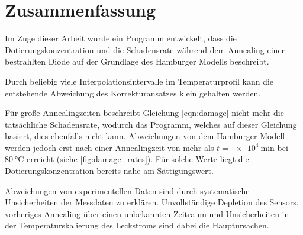 \chapter{Zusammenfassung}
Im Zuge dieser Arbeit wurde ein Programm entwickelt, dass
die Dotierungskonzentration und die Schadensrate während dem
Annealing einer bestrahlten Diode
auf der Grundlage des Hamburger Modells beschreibt.

Durch beliebig viele Interpolationsintervalle im Temperaturprofil kann die entstehende Abweichung des
Korrekturansatzes klein gehalten werden.

Für große Annealingzeiten beschreibt Gleichung \ref{eqn:damage} nicht mehr die tatsächliche Schadensrate, wodurch das Programm,
welches auf dieser Gleichung basiert, dies ebenfalls nicht kann. Abweichungen
von dem Hamburger Modell werden jedoch erst nach
einer Annealingzeit von mehr als $t=\SI{e4}{\minute}$ bei $\SI{80}{\celsius}$ erreicht (siehe
\ref{fig:damage_rates}). Für solche Werte liegt
die Dotierungskonzentration bereits nahe am Sättigungswert.



Abweichungen von experimentellen Daten sind durch systematische Unsicherheiten der Messdaten
zu erklären. Unvollständige Depletion des Sensors, vorheriges Annealing über einen
unbekannten Zeitraum und Unsicherheiten in der Temperaturskalierung des Leckstroms sind dabei die Hauptursachen.

